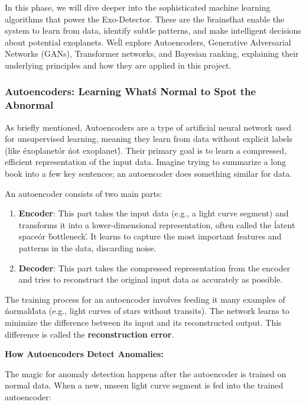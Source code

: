 \documentclass{article}
\begin{document}
In this phase, we will dive deeper into the sophisticated machine learning algorithms that power the Exo-Detector. These are the \'brains\' that enable the system to learn from data, identify subtle patterns, and make intelligent decisions about potential exoplanets. We\'ll explore Autoencoders, Generative Adversarial Networks (GANs), Transformer networks, and Bayesian ranking, explaining their underlying principles and how they are applied in this project.

\subsubsection{Autoencoders: Learning What\'s Normal to Spot the Abnormal}

As briefly mentioned, Autoencoders are a type of artificial neural network used for unsupervised learning, meaning they learn from data without explicit labels (like \'exoplanet\' or \'not exoplanet\'). Their primary goal is to learn a compressed, efficient representation of the input data. Imagine trying to summarize a long book into a few key sentences; an autoencoder does something similar for data.

An autoencoder consists of two main parts:

\begin{enumerate}
    \item \textbf{Encoder}: This part takes the input data (e.g., a light curve segment) and transforms it into a lower-dimensional representation, often called the \'latent space\' or \'bottleneck\'. It learns to capture the most important features and patterns in the data, discarding noise.
    \item \textbf{Decoder}: This part takes the compressed representation from the encoder and tries to reconstruct the original input data as accurately as possible.
\end{enumerate}

The training process for an autoencoder involves feeding it many examples of \'normal\' data (e.g., light curves of stars without transits). The network learns to minimize the difference between its input and its reconstructed output. This difference is called the \textbf{reconstruction error}.

\textbf{How Autoencoders Detect Anomalies:}

The magic for anomaly detection happens after the autoencoder is trained on normal data. When a new, unseen light curve segment is fed into the trained autoencoder:
\end{document}
